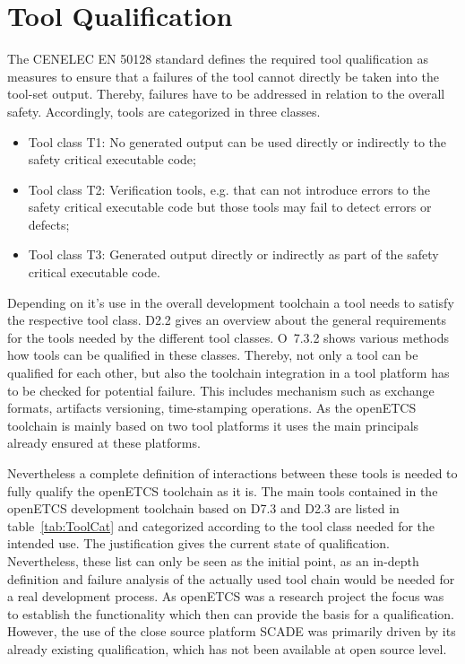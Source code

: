 \documentclass{template/openetcs_report}
\begin{document}
\section{Tool Qualification}

The CENELEC EN 50128 standard defines the required tool qualification as measures to ensure that a failures of the tool cannot directly be taken into the tool-set output. Thereby, failures have to be addressed in relation to the overall safety. Accordingly, tools are categorized in three classes.

\begin{itemize}
\item Tool class T1: No generated output can be used directly or indirectly to the
  safety critical executable code;
\item Tool class T2: Verification tools, e.g. that can not introduce
  errors to the safety critical executable code but those tools may fail to detect errors or
  defects;
\item Tool class T3: Generated output directly or indirectly  as part of the
  safety critical executable code.
\end{itemize}

Depending on it's use in the overall development toolchain a tool needs to satisfy the respective tool class. D2.2 gives an overview about the general requirements for the tools needed by the different tool classes. O~7.3.2 shows various methods how tools can be qualified in these classes. Thereby, not only a tool can be qualified for each other, but also the toolchain integration in a tool platform has to be checked for potential failure. This includes mechanism such as exchange formats, artifacts versioning, time-stamping operations. As the openETCS toolchain is mainly based on two tool platforms it uses the main principals already ensured at these platforms. 

Nevertheless a complete definition of interactions between these tools is needed to fully qualify the openETCS toolchain as it is. The main tools contained in the openETCS development toolchain based on D7.3 and D2.3 are listed in table~\ref{tab:ToolCat} and categorized according to the tool class needed for the intended use. The justification gives the current state of qualification. Nevertheless, these list can only be seen as the initial point, as an in-depth definition and failure analysis of the actually used tool chain would be needed for a real development process. As openETCS was a research project the focus was to establish the functionality which then can provide the basis for a qualification. However, the use of the close source platform SCADE was primarily driven by its already existing qualification, which has not been available at open source level.
\end{document}
